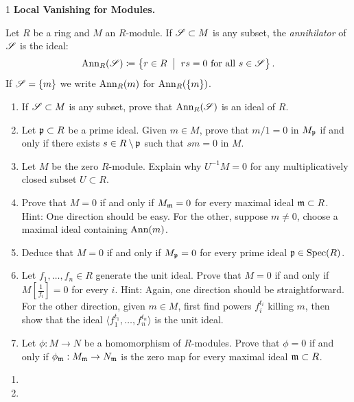 \documentclass[Notebook.tex]{subfiles}
\begin{document}
\begin{problem}{1} \textbf{Local Vanishing for Modules.} 
    
    
    Let $R$ be a ring and $M$ an $R$-module. If $\operatorname{\mathscr S} \subset M$ is any subset, the \emph{annihilator} of $\operatorname{\mathscr S}$ is the ideal:
    \[
    \operatorname{\text{Ann}}_{R}(\operatorname{\mathscr S}) \coloneqq \left\{ r \in R \;\; \big|\;\; rs = 0 \text{ for all $s\in \operatorname{\mathscr S}$}\right\}.
    \] 
    If $\operatorname{\mathscr S}=\{m\}$ we write $\operatorname{\text{Ann}}_{R}(m)$ for $\operatorname{\text{Ann}}_{R}(\{m\})$. 
    \begin{enumerate}
        \item If $\operatorname{\mathscr S} \subset M$ is any subset, prove that $\operatorname{\text{Ann}}_{R}(\operatorname{\mathscr S})$ is an ideal of $R$. 
        \item Let $\operatorname{\mathfrak{p}} \subset R$ be a prime ideal. Given $m \in M$, prove that $m/1=0$ in $M_{\operatorname{\mathfrak{p}}}$ if and only if there exists $s\in R\setminus \operatorname{\mathfrak{p}}$ such that $sm=0$ in $M$.
        \item Let $M$ be the zero $R$-module. Explain why $U^{-1}M=0$ for any multiplicatively closed subset $U \subset R$. 
        \item Prove that $M=0$ if and only if $M_{\operatorname{\mathfrak{m}}}=0$ for every maximal ideal $\operatorname{\mathfrak{m}}\subset R$. Hint: One direction should be easy. For the other, suppose $m\neq 0$, choose a maximal ideal containing $\operatorname{\text{Ann}}(m)$.
        \item Deduce that $M=0$ if and only if $M_{\operatorname{\mathfrak{p}}}=0$ for every prime ideal $\operatorname{\mathfrak{p}}\in \operatorname{Spec}(R)$.
        \item Let $f_1,\ldots,f_n\in R$ generate the unit ideal. Prove that $M=0$ if and only if $M[\frac{1}{f_{i}}]=0$ for every $i$. Hint: Again, one direction should be straightforward. For the other direction, given $m\in M$, first find powers $f_i^{t_i}$ killing $m$, then show that the ideal $\langle f_1^{t_1},\ldots,f_n^{t_n}\rangle$ is the unit ideal.
        \item Let $\phi:M\to N$ be a homomorphism of $R$-modules. Prove that $\phi=0$ if and only if $\phi_{\operatorname{\mathfrak{m}}}:M_{\operatorname{\mathfrak{m}}}\to N_{\operatorname{\mathfrak{m}}}$ is the zero map for every maximal ideal $\operatorname{\mathfrak{m}}\subset R$.
    \end{enumerate}
\end{problem}

\begin{solution}
    \bbni
    \begin{enumerate}
        \item {}
        \item 
    \end{enumerate}
\end{solution}
\end{document}
